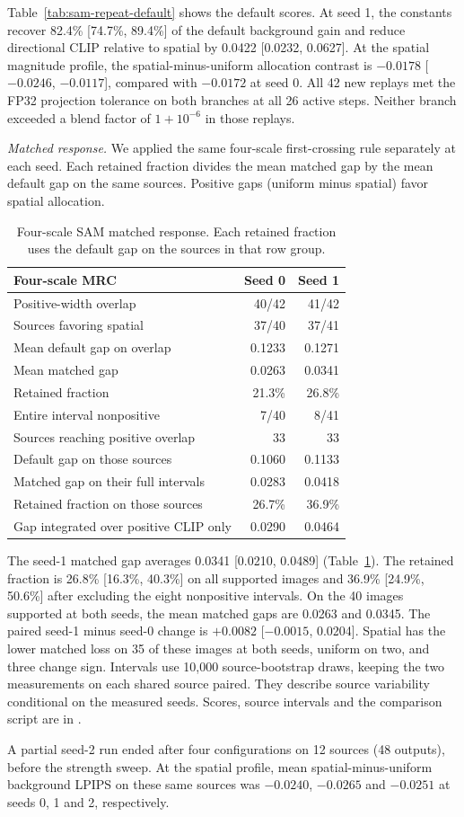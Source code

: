 Table~\ref{tab:sam-repeat-default} shows the default scores. At seed 1, the constants recover 82.4\% [74.7\%, 89.4\%] of the default background gain and reduce directional CLIP relative to spatial by 0.0422 [0.0232, 0.0627]. At the spatial magnitude profile, the spatial-minus-uniform allocation contrast is $-0.0178$ [$-0.0246$, $-0.0117$], compared with $-0.0172$ at seed 0. All 42 new replays met the FP32 projection tolerance on both branches at all 26 active steps. Neither branch exceeded a blend factor of $1+10^{-6}$ in those replays.

\noindent\textit{Matched response.} We applied the same four-scale first-crossing rule separately at each seed. Each retained fraction divides the mean matched gap by the mean default gap on the same sources. Positive gaps (uniform minus spatial) favor spatial allocation.

\begin{table}[!ht]
\centering\small
\caption{Four-scale SAM matched response. Each retained fraction uses the default gap on the sources in that row group.}
\label{tab:sam-repeat-mrc}
\begin{tabular}{@{}lrr@{}}
\toprule
Four-scale MRC & Seed 0 & Seed 1\\
\midrule
Positive-width overlap           & 40/42 & 41/42\\
Sources favoring spatial         & 37/40 & 37/41\\
Mean default gap on overlap      & 0.1233 & 0.1271\\
Mean matched gap                 & 0.0263 & 0.0341\\
Retained fraction                & 21.3\% & 26.8\%\\
Entire interval nonpositive      & 7/40 & 8/41\\
\midrule
Sources reaching positive overlap & 33 & 33\\
Default gap on those sources      & 0.1060 & 0.1133\\
Matched gap on their full intervals & 0.0283 & 0.0418\\
Retained fraction on those sources & 26.7\% & 36.9\%\\
Gap integrated over positive CLIP only & 0.0290 & 0.0464\\
\bottomrule
\end{tabular}
\end{table}

The seed-1 matched gap averages 0.0341 [0.0210, 0.0489] (Table~\ref{tab:sam-repeat-mrc}). The retained fraction is 26.8\% [16.3\%, 40.3\%] on all supported images and 36.9\% [24.9\%, 50.6\%] after excluding the eight nonpositive intervals. On the 40 images supported at both seeds, the mean matched gaps are 0.0263 and 0.0345. The paired seed-1 minus seed-0 change is $+0.0082$ [$-0.0015$, 0.0204]. Spatial has the lower matched loss on 35 of these images at both seeds, uniform on two, and three change sign. Intervals use 10,000 source-bootstrap draws, keeping the two measurements on each shared source paired. They describe source variability conditional on the measured seeds. Scores, source intervals and the comparison script are in .

A partial seed-2 run ended after four configurations on 12 sources (48 outputs), before the strength sweep. At the spatial profile, mean spatial-minus-uniform background LPIPS on these same sources was $-0.0240$, $-0.0265$ and $-0.0251$ at seeds 0, 1 and 2, respectively.
